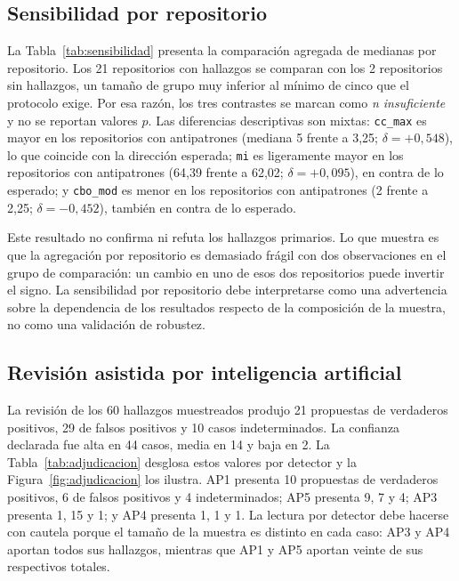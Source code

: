 \subsection{Sensibilidad por repositorio}

La Tabla~\ref{tab:sensibilidad} presenta la comparación agregada de medianas por repositorio. Los 21 repositorios con hallazgos se comparan con los 2 repositorios sin hallazgos, un tamaño de grupo muy inferior al mínimo de cinco que el protocolo exige. Por esa razón, los tres contrastes se marcan como \emph{n insuficiente} y no se reportan valores $p$. Las diferencias descriptivas son mixtas: \texttt{cc\_max} es mayor en los repositorios con antipatrones (mediana 5 frente a 3,25; $\delta=+0{,}548$), lo que coincide con la dirección esperada; \texttt{mi} es ligeramente mayor en los repositorios con antipatrones (64,39 frente a 62,02; $\delta=+0{,}095$), en contra de lo esperado; y \texttt{cbo\_mod} es menor en los repositorios con antipatrones (2 frente a 2,25; $\delta=-0{,}452$), también en contra de lo esperado.



Este resultado no confirma ni refuta los hallazgos primarios. Lo que muestra es que la agregación por repositorio es demasiado frágil con dos observaciones en el grupo de comparación: un cambio en uno de esos dos repositorios puede invertir el signo. La sensibilidad por repositorio debe interpretarse como una advertencia sobre la dependencia de los resultados respecto de la composición de la muestra, no como una validación de robustez.

\subsection{Revisión asistida por inteligencia artificial}

La revisión de los 60 hallazgos muestreados produjo 21 propuestas de verdaderos positivos, 29 de falsos positivos y 10 casos indeterminados. La confianza declarada fue alta en 44 casos, media en 14 y baja en 2. La Tabla~\ref{tab:adjudicacion} desglosa estos valores por detector y la Figura~\ref{fig:adjudicacion} los ilustra. AP1 presenta 10 propuestas de verdaderos positivos, 6 de falsos positivos y 4 indeterminados; AP5 presenta 9, 7 y 4; AP3 presenta 1, 15 y 1; y AP4 presenta 1, 1 y 1. La lectura por detector debe hacerse con cautela porque el tamaño de la muestra es distinto en cada caso: AP3 y AP4 aportan todos sus hallazgos, mientras que AP1 y AP5 aportan veinte de sus respectivos totales.

